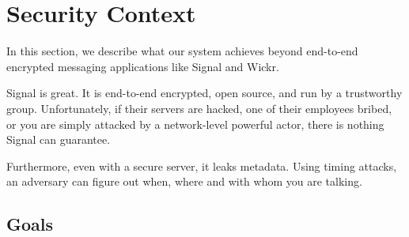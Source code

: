 \section{Security Context}
\label{sec:securitycontext}


In this section, we describe what our system achieves beyond end-to-end encrypted messaging applications like Signal and Wickr.

Signal is great. It is end-to-end encrypted, open source, and run by a trustworthy group. Unfortunately, if their servers are hacked, one of their employees bribed, or you are simply attacked by a network-level powerful actor, there is nothing Signal can guarantee.

Furthermore, even with a secure server, it leaks metadata. Using timing attacks, an adversary can figure out when, where and with whom you are talking. 
\subsection{Goals}

